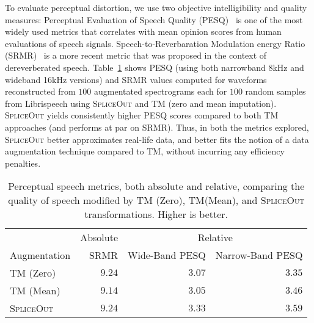 \documentclass{article}
\newcommand{\SpA}{{\textsc{SpliceOut}}\xspace}
\begin{document}
To evaluate perceptual distortion, we use two objective intelligibility and quality measures: Perceptual Evaluation of Speech Quality (PESQ)~\citep{pesq} is one of the most widely used metrics that correlates with mean opinion scores from human evaluations of speech signals. Speech-to-Reverbaration Modulation energy Ratio (SRMR)~\citep{falk2010non} is a more recent metric that was proposed in the context of dereverberated speech. Table~\ref{tab:perceptual} shows PESQ (using both narrowband 8kHz and wideband 16kHz versions) and SRMR values computed for waveforms reconstructed from $100$ augmentated spectrograms each for $100$ random samples from Librispeech using \SpA and TM (zero and mean imputation). \SpA yields consistently higher PESQ scores compared to both TM approaches (and performs at par on SRMR). Thus, in both the metrics explored, \SpA better approximates real-life data, and better fits the notion of a data augmentation technique compared to TM, without incurring any efficiency penalties.

\begin{table}[hbt]
    \centering
    \caption{Perceptual speech metrics, both absolute and relative, comparing the quality of speech modified by TM (Zero), TM(Mean), and \SpA transformations. Higher is better.}
    \begin{tabular}{lrrr}
    \toprule
    & Absolute & \multicolumn{2}{c}{Relative}\\
    \cmidrule{2-4}

    Augmentation & SRMR & Wide-Band PESQ & Narrow-Band PESQ \\
    \midrule
     TM (Zero) & $\mathbf{9.24}$ & $3.07$ & $3.35$  \\
     TM (Mean) & $9.14$ & $3.05$ & $3.46$\\
     \SpA & $\mathbf{9.24}$ & $\mathbf{3.33}$ & $\mathbf{3.59}$ \\
     \bottomrule
    \end{tabular}
    \label{tab:perceptual}
\end{table}



\end{document}
